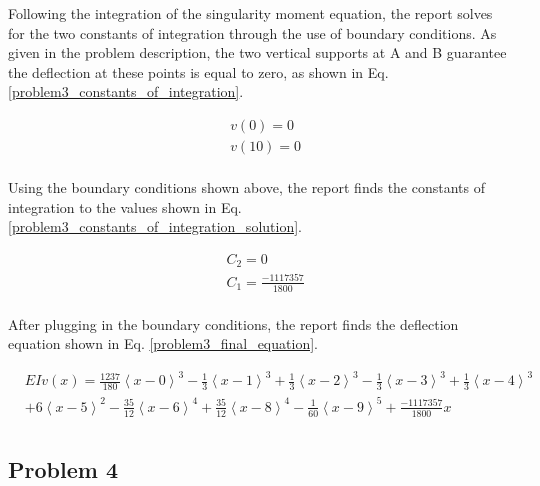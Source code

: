 \documentclass[a4paper]{article}
\begin{document}
Following the integration of the singularity moment equation, the report solves for the two constants of integration through the use of boundary conditions. As given in the problem description, the two vertical supports at A and B guarantee the deflection at these points is equal to zero, as shown in Eq. \ref{problem3_constants_of_integration}.

\begin{equation}
\begin{split}
	& v(0) = 0 \\
	& v(10) = 0 \\
\end{split}
\label{problem3_constants_of_integration}
\end{equation}

Using the boundary conditions shown above, the report finds the constants of integration to the values shown in Eq. \ref{problem3_constants_of_integration_solution}.

\begin{equation}
\begin{split}
	& C_2 = 0 \\
	& C_1 = \frac{-1117357}{1800} \\
\end{split}
\label{problem3_constants_of_integration_solution}
\end{equation}

After plugging in the boundary conditions, the report finds the deflection equation shown in Eq. \ref{problem3_final_equation}.

\begin{equation}
\begin{split}
  & EI v(x) = \frac{1237}{180}\left<x-0\right>^3 - \frac{1}{3}\left<x-1\right>^3 +  \frac{1}{3}\left<x-2\right>^3 - \frac{1}{3}\left<x-3\right>^3 +  \frac{1}{3}\left<x-4\right>^3\\
& + 6\left<x-5\right>^2 -  \frac{35}{12}\left<x-6\right>^4 + \frac{35}{12}\left<x-8\right>^4  - \frac{1}{60}\left<x-9\right>^5 + \frac{-1117357}{1800}x\\
\end{split}
\label{problem3_final_equation}
\end{equation}





\subsection{Problem 4}
\end{document}
